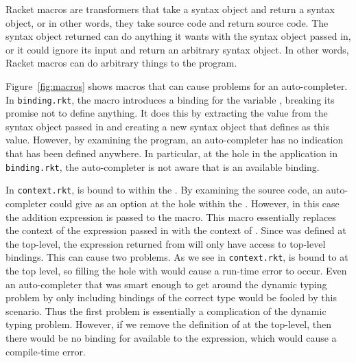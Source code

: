 \documentclass[ms,electronic,twosidetoc,letterpaper,chaptercenter,parttop,lol,lof,lot]{byumsphd}
\begin{document}
Racket macros are transformers that take a syntax object and return a syntax object, or in
other words, they take source code and return source code. The syntax object returned can
do anything it wants with the syntax object passed in, or it could ignore its input and
return an arbitrary syntax object. In other words, Racket macros can do arbitrary things
to the program.

Figure~\ref{fig:macros} shows macros that can cause problems for an auto-completer. In
\texttt{binding.rkt}, the  macro introduces a binding for the variable
, breaking its promise not to define anything. It does this by extracting the
value from the syntax object passed in and creating a new syntax object that defines
 as this value. However, by examining the program, an auto-completer has no
indication that  has been defined anywhere. In particular, at the hole in the
\scheme{+} application in \texttt{binding.rkt}, the auto-completer is not aware that
 is an available binding.

In \texttt{context.rkt},  is bound to  within the . By
examining the source code, an auto-completer could give  as an option at the
hole within the . However, in this case the addition expression is passed to
the  macro. This macro essentially replaces the context of the expression passed
in with the context of . Since  was defined at the
top-level, the expression returned from  will only have access to top-level
bindings. This can cause two problems. As we see in \texttt{context.rkt},  is
bound to  at the top level, so filling the hole with  would cause a
run-time error to occur. Even an auto-completer that was smart enough to get around the
dynamic typing problem by only including bindings of the correct type would be fooled by
this scenario. Thus the first problem is essentially a complication of the dynamic typing
problem. However, if we remove the definition of  at the top-level, then there
would be no binding for  available to the expression, which would cause a
compile-time error.
\end{document}
